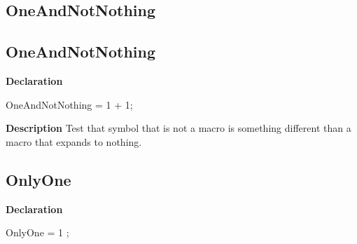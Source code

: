 \documentclass{report}
\newif\ifpdf
\begin{document}
\subsection*{\large{\textbf{OneAndNotNothing}}\normalsize\hspace{1ex}\hrulefill}
\else
\subsection*{OneAndNotNothing}
\fi
\label{ok_macros-OneAndNotNothing}
\begin{list}{}{
\setlength{\itemindent}{0cm}
\setlength{\listparindent}{0cm}
\setlength{\leftmargin}{\evensidemargin}
\addtolength{\leftmargin}{\tmplength}
\settowidth{\labelsep}{X}
\addtolength{\leftmargin}{\labelsep}
\setlength{\labelwidth}{\tmplength}
}
\item[\textbf{Declaration}\hfill]
\ifpdf
\begin{flushleft}
\fi
\begin{ttfamily}
OneAndNotNothing = 1  + 1;\end{ttfamily}

\ifpdf
\end{flushleft}
\fi

\par
\item[\textbf{Description}]
Test that symbol that is not a macro is something different than a macro that expands to nothing.

\end{list}
\ifpdf
\subsection*{\large{\textbf{OnlyOne}}\normalsize\hspace{1ex}\hrulefill}
\else
\subsection*{OnlyOne}
\fi
\label{ok_macros-OnlyOne}
\begin{list}{}{
\setlength{\itemindent}{0cm}
\setlength{\listparindent}{0cm}
\setlength{\leftmargin}{\evensidemargin}
\addtolength{\leftmargin}{\tmplength}
\settowidth{\labelsep}{X}
\addtolength{\leftmargin}{\labelsep}
\setlength{\labelwidth}{\tmplength}
}
\item[\textbf{Declaration}\hfill]
\ifpdf
\begin{flushleft}
\fi
\begin{ttfamily}
OnlyOne = 1 ;\end{ttfamily}

\ifpdf
\end{flushleft}
\fi

\end{list}
\end{document}
